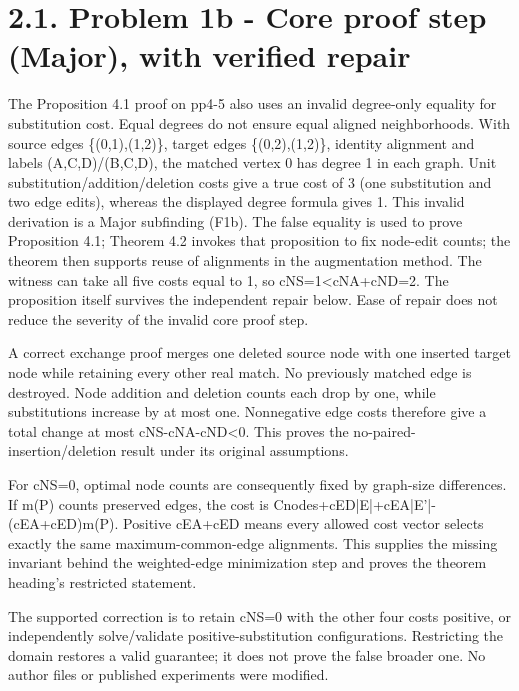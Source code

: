 \documentclass[10pt]{article}
\begin{document}
\section*{2.1. Problem 1b - Core proof step (Major), with verified repair}
The Proposition 4.1 proof on pp4-5 also uses an invalid degree-only equality for substitution cost. Equal degrees do not ensure equal aligned neighborhoods. With source edges \{(0,1),(1,2)\}, target edges \{(0,2),(1,2)\}, identity alignment and labels (A,C,D)/(B,C,D), the matched vertex 0 has degree 1 in each graph. Unit substitution/addition/deletion costs give a true cost of 3 (one substitution and two edge edits), whereas the displayed degree formula gives 1. This invalid derivation is a Major subfinding (F1b). The false equality is used to prove Proposition 4.1; Theorem 4.2 invokes that proposition to fix node-edit counts; the theorem then supports reuse of alignments in the augmentation method. The witness can take all five costs equal to 1, so cNS=1<cNA+cND=2. The proposition itself survives the independent repair below. Ease of repair does not reduce the severity of the invalid core proof step.\par
A correct exchange proof merges one deleted source node with one inserted target node while retaining every other real match. No previously matched edge is destroyed. Node addition and deletion counts each drop by one, while substitutions increase by at most one. Nonnegative edge costs therefore give a total change at most cNS-cNA-cND<0. This proves the no-paired-insertion/deletion result under its original assumptions.\par
For cNS=0, optimal node counts are consequently fixed by graph-size differences. If m(P) counts preserved edges, the cost is Cnodes+cED|E|+cEA|E’|-(cEA+cED)m(P). Positive cEA+cED means every allowed cost vector selects exactly the same maximum-common-edge alignments. This supplies the missing invariant behind the weighted-edge minimization step and proves the theorem heading’s restricted statement.\par
The supported correction is to retain cNS=0 with the other four costs positive, or independently solve/validate positive-substitution configurations. Restricting the domain restores a valid guarantee; it does not prove the false broader one. No author files or published experiments were modified.\par
\end{document}
